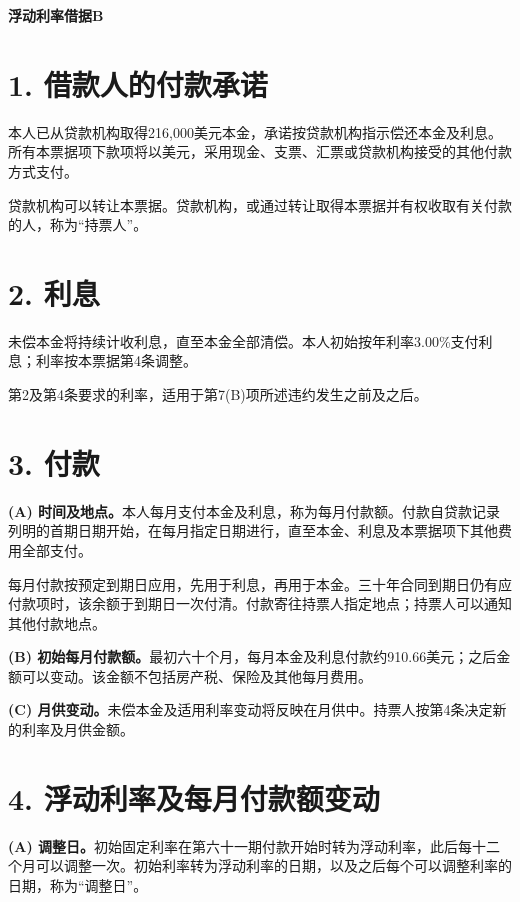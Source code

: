 \documentclass[UTF8,fontset=none,11pt,a4paper]{ctexart}
\begin{document}
{\noindent\fontsize{20}{25}\selectfont\bfseries 浮动利率借据B\par}
\vspace{10pt}
\section*{1. 借款人的付款承诺}
本人已从贷款机构取得216,000美元本金，承诺按贷款机构指示偿还本金及利息。所有本票据项下款项将以美元，采用现金、支票、汇票或贷款机构接受的其他付款\allowbreak\mbox{方式支付。}


贷款机构可以转让本票据。贷款机构，或通过转让取得本票据并有权收取有关付款的人，称为“持票人”。


\section*{2. 利息}
未偿本金将持续计收利息，直至本金全部清偿。本人初始按年利率3.00\%支付利息；利率按本票据第4条调整。


第2及第4条要求的利率，适用于第7(B)项所述违约发生之\allowbreak\mbox{前及之后。}


\section*{3. 付款}
\textbf{(A) 时间及地点。}本人每月支付本金及利息，称为每月付款额。付款自贷款记录列明的首期日期开始，在每月指定日期进行，直至本金、利息及本票据项下其他费用\allowbreak\mbox{全部支付。}


每月付款按预定到期日应用，先用于利息，再用于本金。三十年合同到期日仍有应付款项时，该余额于到期日一次付清。付款寄往持票人指定地点；持票人可以通知其他\allowbreak\mbox{付款地点。}


\textbf{(B) 初始每月付款额。}最初六十个月，每月本金及利息付款约910.66美元；之后金额可以变动。该金额不包括房产税、保险及其他\allowbreak\mbox{每月费用。}


\textbf{(C) 月供变动。}未偿本金及适用利率变动将反映在月供中。持票人按第4条决定新的利率及\allowbreak\mbox{月供金额。}


\section*{4. 浮动利率及每月付款额变动}
\textbf{(A) 调整日。}初始固定利率在第六十一期付款开始时转为浮动利率，此后每十二个月可以调整一次。初始利率转为浮动利率的日期，以及之后每个可以调整利率的日期，称为“调整日”。
\end{document}
